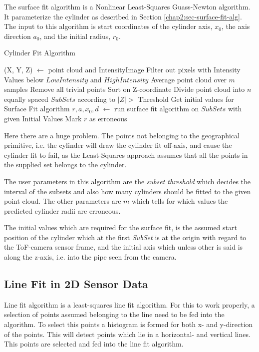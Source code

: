 The surface fit algorithm is a Nonlinear Least-Squares Guass-Newton algorithm. It parameterize the
cylinder as described in Section \ref{chap2:sec-surface-fit-alg}. The input to this
algorithm is start coordinates of the cylinder axis, $x_0$, the axis direction $a_0$, and
the initial radius, $r_0$.
\begin{algorithm}[htbp]
    \caption{Cylinder Fit Algorithm}
    \label{chap5:alg-cylinderfit}
    \begin{algorithmic}
        \REQUIRE (X, Y, Z) $\leftarrow$ point cloud and IntensityImage
        \STATE Filter out pixels with Intensity Values below $LowIntensity$ and
        $HighIntensity$
        \STATE Average point cloud over $m$ samples
        \STATE Remove all trivial points
        \STATE Sort on Z-coordinate
        \STATE Divide point cloud into $n$ equally spaced $SubSets$ according to $|Z| >$
        Threshold
            \STATE Get initial values for Surface Fit algorithm
            \STATE  $r, a, x_0, d$ $\leftarrow$ run surface fit algorithm on $SubSets$
            with given Initial Values
        \ENDFOR
                \STATE Mark $r$ as erroneous
            \ENDIF
        \ENDFOR
    \end{algorithmic}
\end{algorithm}
Here there are a huge problem. The points not belonging to the geographical
primitive, i.e. the cylinder will draw the cylinder fit off-axis, and cause the cylinder
fit to fail, as the Least-Squares approach assumes that all the points in the supplied set
belongs to the cylinder. 

The user parameters in this algorithm are the \emph{subset threshold} which decides the interval
of the subsets and also how many cylinders should be fitted to the given point cloud. The
other parameters are $m$ which tells for which values the predicted cylinder radii are
erroneous. 

The initial values which are required for the surface fit, is the assumed start position
of the cylinder which at the first \emph{SubSet} is at the origin with regard to the
ToF-camera sensor frame, and the initial axis which unless other is said is along the
z-axis, i.e. into the pipe seen from the camera.


\subsection{Line Fit in 2D Sensor Data}
Line fit algorithm is a least-squares line fit algorithm. For this to work properly, a
selection of points assumed belonging to the line need to be fed into the algorithm. To
select this points a histogram is formed for both x- and y-direction of the points. This
will detect points which lie in a horizontal- and vertical lines. This points are selected
and fed into the line fit algorithm. 

